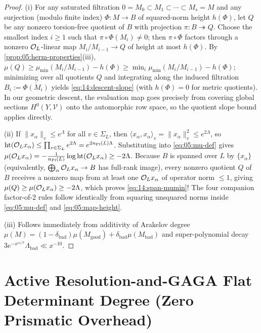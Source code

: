 \begin{proof}
(i) For any saturated filtration $0 = M_0 \subset M_1 \subset \cdots \subset M_s = M$ and any surjection (modulo finite index) $\Phi : M \to B$ of squared-norm height $h(\Phi)$, let $Q$ be any nonzero torsion-free quotient of $B$ with projection $\pi : B \twoheadrightarrow Q$. Choose the smallest index $i \ge 1$ such that $\pi \circ \Phi(M_i) \neq 0$; then $\pi \circ \Phi$ factors through a nonzero $\mathcal{O}_L$-linear map $M_i / M_{i-1} \to Q$ of height at most $h(\Phi)$. By \cref{prop:05:herm-properties}(iii), $\mu(Q) \ge \mu_{\min}(M_i / M_{i-1}) - h(\Phi) \ge \min_i \mu_{\min}(M_i / M_{i-1}) - h(\Phi)$; minimizing over all quotients $Q$ and integrating along the induced filtration $B_i := \overline{\Phi(M_i)}$ yields \eqref{eq:14:descent-slope} (with $h(\Phi) = 0$ for metric quotients). In our geometric descent, the evaluation map goes precisely from covering global sections $H^0(Y, \mathcal{V})$ onto the automorphic row space, so the quotient slope bound applies directly.

(ii) If $\|x_\alpha\|_v \le e^\Lambda$ for all $v \in \Sigma_L$, then $\langle x_\alpha, x_\alpha \rangle_v = \|x_\alpha\|_v^2 \le e^{2\Lambda}$, so $\operatorname{ht}(\mathcal{O}_L x_\alpha) \le \prod_{v \in \Sigma_L} e^{2\Lambda} = e^{2 n_{\mathrm{Pl}}(L)\Lambda}$. Substituting into \eqref{eq:05:mu-def} gives $\mu(\mathcal{O}_L x_\alpha) = -\frac{1}{n_{\mathrm{Pl}}(L)}\log\operatorname{ht}(\mathcal{O}_L x_\alpha) \ge -2\Lambda$. Because $B$ is spanned over $L$ by $\{x_\alpha\}$ (equivalently, $\bigoplus_\alpha \mathcal{O}_L x_\alpha \to B$ has full-rank image), every nonzero quotient $Q$ of $B$ receives a nonzero map from at least one $\mathcal{O}_L x_\alpha$ of operator norm $\le 1$, giving $\mu(Q) \ge \mu(\mathcal{O}_L x_\alpha) \ge -2\Lambda$, which proves \eqref{eq:14:span-mumin}! The four companion factor-of-$2$ rules follow identically from squaring unsquared norms inside \eqref{eq:05:mu-def} and \eqref{eq:05:map-height}.

(iii) Follows immediately from additivity of Arakelov degree $\mu(M) = (1 - \delta_{\mathrm{bad}})\mu(M_{\mathrm{good}}) + \delta_{\mathrm{bad}}\mu(M_{\mathrm{bad}})$ and super-polynomial decay $3 e^{-x^{\varepsilon_0/7}}\Lambda_{\mathrm{bad}} \ll x^{-10}$.
\end{proof}

\section{Active Resolution-and-GAGA Flat Determinant Degree (Zero Prismatic Overhead)}
\label{sec:14:flat-degree}

